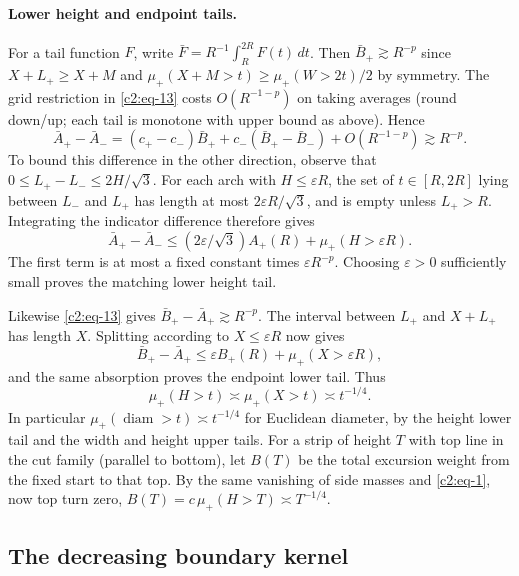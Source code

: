 \paragraph{Lower height and endpoint tails.}
For a tail function $F$, write
$\bar F=R^{-1}\int_R^{2R}F(t)\,dt$. Then \(\bar B_+\gtrsim R^{-p}\) since \(X+L_+\ge X+M\) and \(\mu_+(X+M>t)\ge\mu_+(W>2t)/2\) by symmetry. The grid restriction in \eqref{c2:eq-13} costs \(O(R^{-1-p})\) on taking averages (round down/up; each tail is monotone with upper bound as above). Hence
\[
 \bar A_+-\bar A_-=(c_+-c_-)\bar B_+ + c_-(\bar B_+-\bar B_-)+O(R^{-1-p})\gtrsim R^{-p}.
\]
To bound this difference in the other direction, observe that
$0\le L_+-L_-\le2H/\sqrt3$.  For each arch with $H\le\varepsilon R$,
the set of $t\in[R,2R]$ lying between $L_-$ and $L_+$ has length at
most $2\varepsilon R/\sqrt3$, and is empty unless $L_+>R$.
Integrating the indicator difference therefore gives
\[
 \bar A_+-\bar A_-
 \le (2\varepsilon/\sqrt3)A_+(R)
       +\mu_+(H>\varepsilon R).
\]
The first term is at most a fixed constant times
$\varepsilon R^{-p}$.  Choosing $\varepsilon>0$ sufficiently small
proves the matching lower height tail.

Likewise \eqref{c2:eq-13} gives
$\bar B_+-\bar A_+\gtrsim R^{-p}$.  The interval between $L_+$ and
$X+L_+$ has length $X$.  Splitting according to $X\le\varepsilon R$
now gives
\[
 \bar B_+-\bar A_+
 \le\varepsilon B_+(R)+\mu_+(X>\varepsilon R),
\]
and the same absorption proves the endpoint lower tail.  Thus
\begin{equation}
 \mu_+(H>t)\asymp\mu_+(X>t)\asymp t^{-1/4}.                                     \label{c2:eq-14}
\end{equation}
In particular \(\mu_+(\operatorname{diam}>t)\asymp t^{-1/4}\) for Euclidean diameter, by the height lower tail and the width and height upper tails. For a strip of height \(T\) with top line in the cut family (parallel to bottom), let \(B(T)\) be the total excursion weight from the fixed start to that top. By the same vanishing of side masses and \eqref{c2:eq-1}, now top turn zero, \(B(T)=c\,\mu_+(H>T)\asymp T^{-1/4}\).

\subsection{The decreasing boundary kernel}

